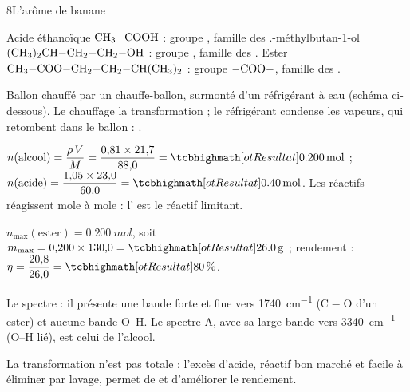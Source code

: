 

\begin{corrigeBac}{8}{L'arôme de banane}
\begin{questions}
\item Acide éthanoïque $\ce{CH3-COOH}$ : groupe , famille des .-méthylbutan-1-ol $\ce{(CH3)2CH-CH2-CH2-OH}$ : groupe , famille des .\newline
Ester $\ce{CH3-COO-CH2-CH2-CH(CH3)2}$ : groupe  $\ce{-COO-}$, famille des . 
\item Ballon chauffé par un chauffe-ballon, surmonté d'un réfrigérant à eau (schéma ci-dessous). Le chauffage  la
transformation ; le réfrigérant condense les vapeurs, qui retombent dans le ballon : . 
\item $n(\text{alcool})=\dfrac{\rho\,V}{M}=\dfrac{0{,}81\times21{,}7}{88{,}0}=\res{\qty{0,200}{mol}}$ ; $n(\text{acide})=\dfrac{1{,}05\times23{,}0}{60{,}0}=\res{\qty{0,40}{mol}}$. Les
réactifs réagissent mole à mole : l' est le réactif limitant. 
\item $n_\mathrm{max}(\text{ester})=\qty{0,200}{mol}$, soit $m_\mathrm{max}=0{,}200\times130{,}0=\res{\qty{26,0}{g}}$ ; rendement : $\eta=\dfrac{20{,}8}{26{,}0}=\res{\qty{80}{\percent}}$. 
\item Le spectre  : il présente une bande forte et fine vers \qty{1740}{cm^{-1}} (C$=$O d'un ester) et aucune bande O--H. Le
spectre A, avec sa large bande vers \qty{3340}{cm^{-1}} (O--H lié), est celui de l'alcool. 
\item La transformation n'est pas totale : l'excès d'acide, réactif bon marché et facile à éliminer par lavage, permet de
 et d'améliorer le rendement. 
\end{questions}
\end{corrigeBac}

